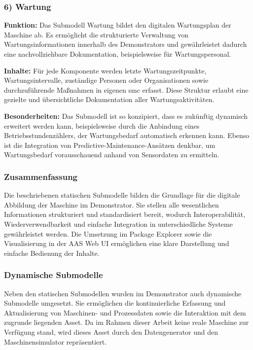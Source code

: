 \subsubsection*{6) Wartung}
\vspace{-0.5em}
\textbf{Funktion:}  
Das Submodell Wartung bildet den digitalen Wartungsplan der Maschine ab.  
Es ermöglicht die strukturierte Verwaltung von Wartungsinformationen innerhalb des Demonstrators und gewährleistet dadurch eine nachvollziehbare Dokumentation, beispielsweise für Wartungspersonal.

\textbf{Inhalte:}  
Für jede Komponente werden letzte Wartungszeitpunkte, Wartungsintervalle, zuständige Personen oder Organisationen sowie durchzuführende Maßnahmen in eigenen \acs{smc} erfasst.  
Diese Struktur erlaubt eine gezielte und übersichtliche Dokumentation aller Wartungsaktivitäten.

\textbf{Besonderheiten:}  
Das Submodell ist so konzipiert, dass es zukünftig dynamisch erweitert werden kann, beispielsweise durch die Anbindung eines Betriebsstundenzählers, der Wartungsbedarf automatisch erkennen kann.  
Ebenso ist die Integration von Predictive-Maintenance-Ansätzen denkbar, um Wartungsbedarf vorausschauend anhand von Sensordaten zu ermitteln.

\subsubsection*{Zusammenfassung}

Die beschriebenen statischen Submodelle bilden die Grundlage für die digitale Abbildung der Maschine im Demonstrator. 
Sie stellen alle wesentlichen Informationen strukturiert und standardisiert bereit, wodurch Interoperabilität, Wiederverwendbarkeit und einfache Integration in unterschiedliche Systeme gewährleistet werden. 
Die Umsetzung im Package Explorer sowie die Visualisierung in der AAS Web UI ermöglichen eine klare Darstellung und einfache Bedienung der Inhalte.

\newpage
\subsubsection{Dynamische Submodelle}
\label{sec:DynamischeSubmodelle}
Neben den statischen Submodellen wurden im Demonstrator auch dynamische Submodelle umgesetzt.
Sie ermöglichen die kontinuierliche Erfassung und Aktualisierung von Maschinen- und Prozessdaten sowie die Interaktion mit dem zugrunde liegenden Asset.
Da im Rahmen dieser Arbeit keine reale Maschine zur Verfügung stand, wird dieses Asset durch den Datengenerator und den Maschinensimulator repräsentiert.

